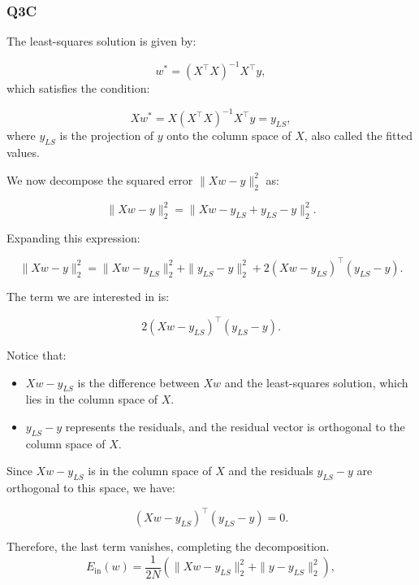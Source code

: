 \subsubsection{Q3C}
\begin{example}
    The least-squares solution is given by:

    \[
    w^* = (X^\top X)^{-1} X^\top y,
    \]
    which satisfies the condition:

    \[
    X w^* = X (X^\top X)^{-1} X^\top y = y_{LS},
    \]
    where \( y_{LS} \) is the projection of \( y \) onto the column space of \( X \), also called the fitted values.

    We now decompose the squared error \( \|Xw - y\|_2^2 \) as:

    \[
    \|Xw - y\|_2^2 = \|Xw - y_{LS} + y_{LS} - y\|_2^2.
    \]

    Expanding this expression:

    \[
    \|Xw - y\|_2^2 = \|Xw - y_{LS}\|_2^2 + \|y_{LS} - y\|_2^2 + 2(Xw - y_{LS})^\top (y_{LS} - y).
    \]

    The term we are interested in is:

    \[
    2(Xw - y_{LS})^\top (y_{LS} - y).
    \]

    Notice that:
    \begin{itemize}
        \item \( Xw - y_{LS} \) is the difference between \( Xw \) and the least-squares solution, which lies in the column space of \( X \).
        \item \( y_{LS} - y \) represents the residuals, and the residual vector is orthogonal to the column space of \( X \).
    \end{itemize}

    Since \( Xw - y_{LS} \) is in the column space of \( X \) and the residuals \( y_{LS} - y \) are orthogonal to this space, we have:

    \[
    (Xw - y_{LS})^\top (y_{LS} - y) = 0.
    \]

    Therefore, the last term vanishes, completing the decomposition.
    \[
    E_{\text{in}}(w) = \frac{1}{2N} \left( \| Xw - y_{LS} \|_2^2 + \| y - y_{LS} \|_2^2 \right),
    \]

\end{example}

